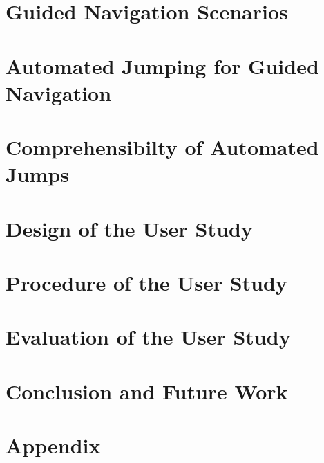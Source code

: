 
\chapter{Guided Navigation Scenarios}



\chapter{Automated Jumping for Guided Navigation}



\chapter{Comprehensibilty of Automated Jumps}



\chapter{Design of the User Study}



\chapter{Procedure of the User Study}



\chapter{Evaluation of the User Study}



\chapter{Conclusion and Future Work}






{\footnotesize
{}

}


\appendix
\chapter{Appendix}



